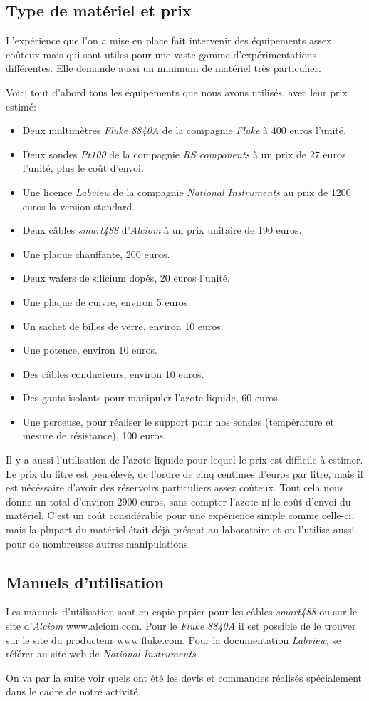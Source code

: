 \subsection{Type de matériel et prix}
L'expérience que l'on a mise en place fait intervenir des équipements assez coûteux mais qui sont utiles pour une vaste gamme d'expérimentations différentes. Elle demande aussi un minimum de matériel très particulier.

\bigskip
Voici tout d'abord tous les équipements que nous avons utilisés, avec leur prix estimé:

\begin{itemize}
  \item Deux multimètres \emph{Fluke 8840A} de la compagnie \emph{Fluke} à 400 euros l'unité.
  \item Deux sondes \emph{Pt100} de la compagnie \emph{RS components} à un prix de 27 euros l'unité, plus le coût d'envoi.
  \item Une licence \emph{Labview} de la compagnie \emph{National Instruments} au prix de 1200 euros la version standard.
  \item Deux câbles \emph{smart488} d'\emph{Alciom} à un prix unitaire de 190 euros.
  \item Une plaque chauffante, 200 euros.
  \item Deux wafers de silicium dopés, 20 euros l'unité.
  \item Une plaque de cuivre, environ 5 euros.
  \item Un sachet de billes de verre, environ 10 euros.
  \item Une potence, environ 10 euros. 
  \item Des câbles conducteurs, environ 10 euros.
  \item Des gants isolants pour manipuler l'azote liquide, 60 euros.
  \item Une perceuse, pour réaliser le support pour nos sondes (température et mesure de résistance), 100 euros.
\end{itemize}

\bigskip
Il y a aussi l'utilisation de l'azote liquide pour lequel le prix est difficile à estimer. Le prix du litre est peu élevé, de l'ordre de cinq centimes d'euros par litre, mais il est nécéssaire d'avoir des réservoirs particuliers assez coûteux.
Tout cela nous donne un total d'environ 2900 euros, sans compter l'azote ni le coût d'envoi du matériel.
C'est un coût considérable pour une expérience simple comme celle-ci, mais la plupart du matériel était déjà présent au laboratoire et on l'utilise aussi pour de nombreuses autres manipulations.


\subsection{Manuels d'utilisation}
Les manuels d'utilisation sont en copie papier pour les câbles \emph{smart488} ou sur le site d'\emph{Alciom} www.alciom.com. Pour le \emph{Fluke 8840A} il est possible de le trouver sur le site du producteur www.fluke.com. Pour la documentation \emph{Labview}, se référer au site web de \emph{National Instruments}.

On va par la suite voir quels ont été les devis et commandes réalisés spécialement dans le cadre de notre activité.
